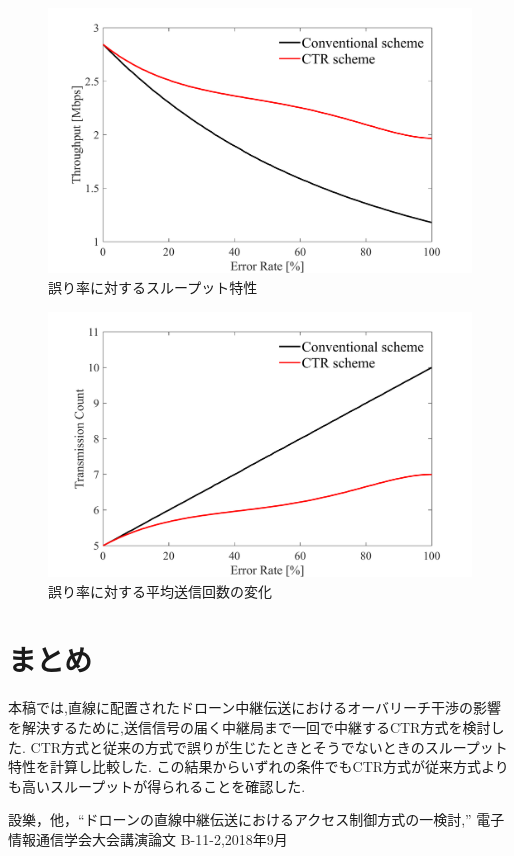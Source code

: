 \documentclass[a4paper,10pt]{ltjsarticle}
\begin{document}
\begin{figure}[H]
  \centering
  \includegraphics[width=\linewidth]{throughput_probabilistic_retry_v3.pdf} %
  \caption{誤り率に対するスループット特性}
  \label{fig:throughput_v3} %
\end{figure}
\begin{figure}[H]
  \centering
  \includegraphics[width=\linewidth]{throughput_probabilistic_retry_v3.1.pdf} %
  \caption{誤り率に対する平均送信回数の変化}
  \label{fig:throughput_v3.1} %
\end{figure}

\section{まとめ}
本稿では,直線に配置されたドローン中継伝送におけるオーバリーチ干渉の影響を解決するために,送信信号の届く中継局まで一回で中継するCTR方式を検討した.
CTR方式と従来の方式で誤りが生じたときとそうでないときのスループット特性を計算し比較した.
この結果からいずれの条件でもCTR方式が従来方式よりも高いスループットが得られることを確認した.

\begin{thebibliography}{99}
  設樂，他，“ドローンの直線中継伝送におけるアクセス制御方式の一検討,” 電子情報通信学会大会講演論文 B-11-2,2018年9月
\end{thebibliography}

%
\end{document}
